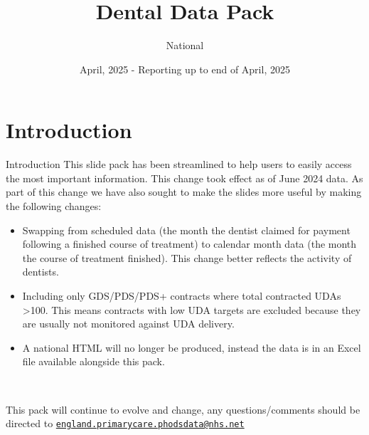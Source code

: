 \documentclass[
  8pt,
  ignorenonframetext,
  aspectratio = 169]{beamer}
\title{Dental Data Pack}
\subtitle{National}
\author{April, 2025 - Reporting up to end of April, 2025}
\date{}
\providecommand{\tightlist}{%
  \setlength{\itemsep}{0pt}\setlength{\parskip}{0pt}}
\begin{document}
\frame{\titlepage}

\begin{frame}[allowframebreaks]
  \tableofcontents[hideallsubsections]
\end{frame}
\hypertarget{introduction}{%
\section{Introduction}\label{introduction}}

\begin{frame}{Introduction}
\protect\hypertarget{introduction-1}{}
This slide pack has been streamlined to help users to easily access the
most important information. This change took effect as of June 2024
data. As part of this change we have also sought to make the slides more
useful by making the following changes:

\begin{itemize}
\tightlist
\item
  Swapping from scheduled data (the month the dentist claimed for
  payment following a finished course of treatment) to calendar month
  data (the month the course of treatment finished). This change better
  reflects the activity of dentists.
\item
  Including only GDS/PDS/PDS+ contracts where total contracted UDAs
  \textgreater100. This means contracts with low UDA targets are
  excluded because they are usually not monitored against UDA delivery.
\item
  A national HTML will no longer be produced, instead the data is in an
  Excel file available alongside this pack.
\end{itemize}

~

This pack will continue to evolve and change, any questions/comments
should be directed to
\href{mailto:england.primarycare.phodsdata@nhs.net}{\nolinkurl{england.primarycare.phodsdata@nhs.net}}
\end{frame}
\end{document}
